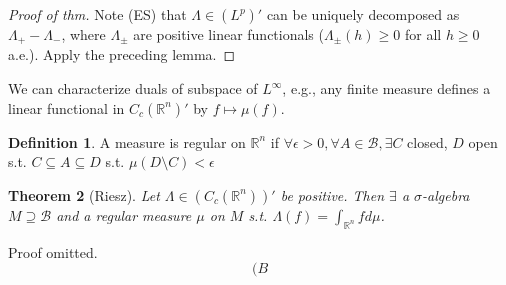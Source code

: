 \documentclass{article}
\theoremstyle{definition}
\newtheorem{defn}{Definition}[section]
\theoremstyle{remark}
\theoremstyle{plain}
\newtheorem{thm}[defn]{Theorem}
\newcommand{\RR}{\mathbb{R}}
\begin{document}
\begin{proof}[Proof of thm]
    Note (ES) that $\Lambda\in (L^p)'$ can be uniquely decomposed as $\Lambda_+-\Lambda_-$, where $\Lambda_\pm$ are positive linear functionals ($\Lambda_\pm(h)\ge 0$ for all $h\ge 0$ a.e.). Apply the preceding lemma.
\end{proof}

We can characterize duals of subspace of $L^\infty$, e.g., any finite measure defines a linear functional in $C_c(\RR^n)'$ by $f\mapsto \mu(f)$.

\begin{defn}
    A measure is regular on $\RR^n$ if $\forall\epsilon>0,\forall A\in\mathcal B,\exists C$ closed, $D$ open s.t. $C\subseteq A\subseteq D$ s.t. $\mu(D\setminus C)<\epsilon$
\end{defn}
\begin{thm}[Riesz]
    Let $\Lambda\in (C_c(\RR^n))'$ be positive. Then $\exists$ a $\sigma$-algebra $M\supseteq\mathcal B$ and a regular measure $\mu$ on $M$ s.t. $\Lambda(f)=\int_{\RR^n}fd\mu$.
\end{thm}
Proof omitted.
\[(B\tag{Owen's Signature}\]
\end{document}

